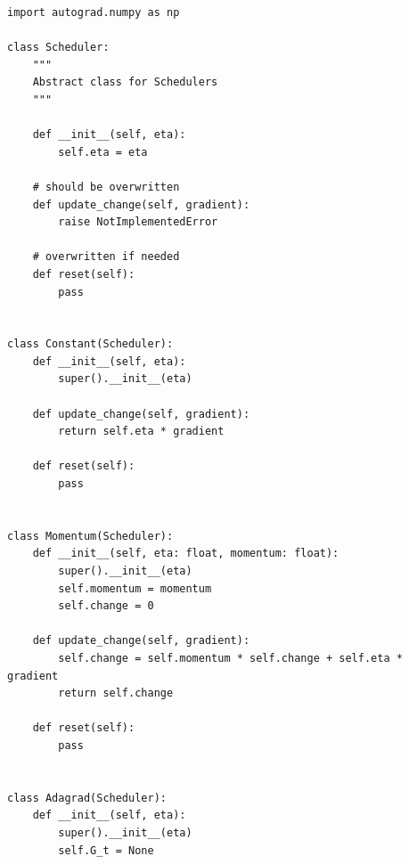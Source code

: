 \documentclass{beamer}
\begin{document}
\begin{frame}

















































\begin{verbatim}
import autograd.numpy as np

class Scheduler:
    """
    Abstract class for Schedulers
    """

    def __init__(self, eta):
        self.eta = eta

    # should be overwritten
    def update_change(self, gradient):
        raise NotImplementedError

    # overwritten if needed
    def reset(self):
        pass


class Constant(Scheduler):
    def __init__(self, eta):
        super().__init__(eta)

    def update_change(self, gradient):
        return self.eta * gradient
    
    def reset(self):
        pass


class Momentum(Scheduler):
    def __init__(self, eta: float, momentum: float):
        super().__init__(eta)
        self.momentum = momentum
        self.change = 0

    def update_change(self, gradient):
        self.change = self.momentum * self.change + self.eta * gradient
        return self.change

    def reset(self):
        pass


class Adagrad(Scheduler):
    def __init__(self, eta):
        super().__init__(eta)
        self.G_t = None


\end{verbatim}
\end{frame}
\end{document}
